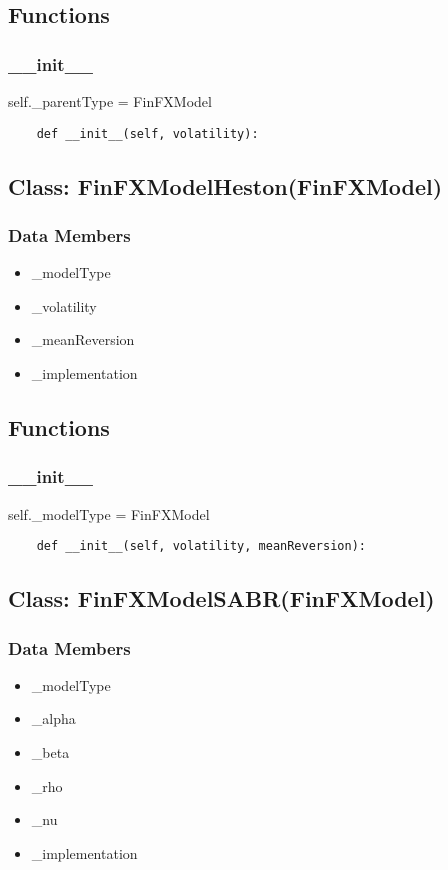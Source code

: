 \documentclass[twoside,11pt]{book}
\begin{document}
\subsection*{Functions}

\subsubsection*{{\bf \_\_init\_\_}}
self.\_parentType = FinFXModel 

\begin{lstlisting}
    def __init__(self, volatility):
\end{lstlisting}

\subsection*{Class: FinFXModelHeston(FinFXModel)}


\subsubsection*{Data Members}
\begin{itemize}
\item{\_modelType}
\item{\_volatility}
\item{\_meanReversion}
\item{\_implementation}
\end{itemize}

\subsection*{Functions}

\subsubsection*{{\bf \_\_init\_\_}}
self.\_modelType = FinFXModel 

\begin{lstlisting}
    def __init__(self, volatility, meanReversion):
\end{lstlisting}

\subsection*{Class: FinFXModelSABR(FinFXModel)}


\subsubsection*{Data Members}
\begin{itemize}
\item{\_modelType}
\item{\_alpha}
\item{\_beta}
\item{\_rho}
\item{\_nu}
\item{\_implementation}
\end{itemize}
\end{document}
